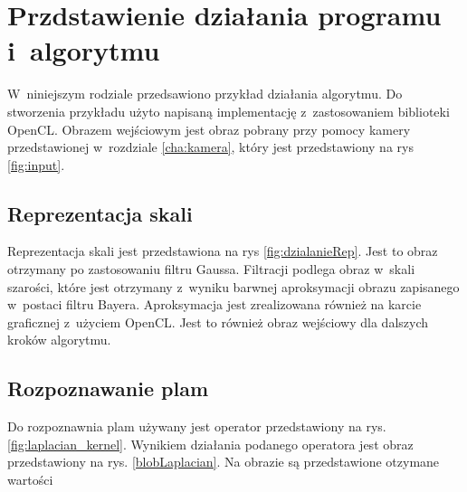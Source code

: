 \chapter{Przdstawienie działania programu i~algorytmu}
\label{cha:dzialanie}

W~niniejszym rodziale przedsawiono przykład działania algorytmu. Do stworzenia przykładu użyto napisaną implementację z~zastosowaniem biblioteki OpenCL. Obrazem wejściowym jest obraz pobrany przy pomocy kamery przedstawionej w~rozdziale \ref{cha:kamera}, który jest przedstawiony na rys \ref{fig:input}.


\section{Reprezentacja skali}
\label{sec:dzialanieRep}

Reprezentacja skali jest przedstawiona na rys \ref{fig:dzialanieRep}. Jest to obraz otrzymany po zastosowaniu filtru Gaussa. Filtracji podlega obraz w~skali szarości, które jest otrzymany z~wyniku barwnej aproksymacji obrazu zapisanego w~postaci filtru Bayera. Aproksymacja jest zrealizowana również na karcie graficznej z~użyciem OpenCL. Jest to również obraz wejściowy dla dalszych kroków algorytmu.


\section{Rozpoznawanie plam}
\label{sec:dzialanieBlob}

Do rozpoznawnia plam używany jest operator przedstawiony na rys. \ref{fig:laplacian_kernel}. Wynikiem działania podanego operatora jest obraz przedstawiony na rys. \ref{blobLaplacian}. Na obrazie są przedstawione otzymane wartości

